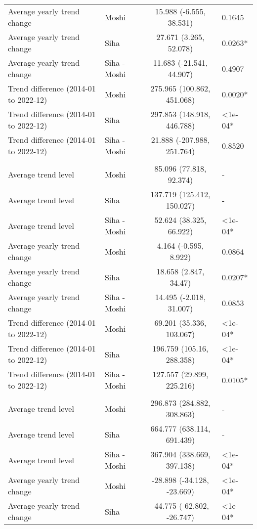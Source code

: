 \begin{longtable}{l|lcl}
Average yearly trend change & Moshi & 15.988 (-6.555, 38.531) & 0.1645 \\ 
Average yearly trend change & Siha & 27.671 (3.265, 52.078) & 0.0263* \\ 
Average yearly trend change & Siha - Moshi & 11.683 (-21.541, 44.907) & 0.4907 \\ 
Trend difference (2014-01 to 2022-12) & Moshi & 275.965 (100.862, 451.068) & 0.0020* \\ 
Trend difference (2014-01 to 2022-12) & Siha & 297.853 (148.918, 446.788) & <1e-04* \\ 
Trend difference (2014-01 to 2022-12) & Siha - Moshi & 21.888 (-207.988, 251.764) & 0.8520 \\ 
\midrule\addlinespace[2.5pt]
\multicolumn{4}{l}{Infectious Eye Disease} \\[2.5pt] 
\midrule\addlinespace[2.5pt]
Average trend level & Moshi & 85.096 (77.818, 92.374) & - \\ 
Average trend level & Siha & 137.719 (125.412, 150.027) & - \\ 
Average trend level & Siha - Moshi & 52.624 (38.325, 66.922) & <1e-04* \\ 
Average yearly trend change & Moshi & 4.164 (-0.595, 8.922) & 0.0864 \\ 
Average yearly trend change & Siha & 18.658 (2.847, 34.47) & 0.0207* \\ 
Average yearly trend change & Siha - Moshi & 14.495 (-2.018, 31.007) & 0.0853 \\ 
Trend difference (2014-01 to 2022-12) & Moshi & 69.201 (35.336, 103.067) & <1e-04* \\ 
Trend difference (2014-01 to 2022-12) & Siha & 196.759 (105.16, 288.358) & <1e-04* \\ 
Trend difference (2014-01 to 2022-12) & Siha - Moshi & 127.557 (29.899, 225.216) & 0.0105* \\ 
\midrule\addlinespace[2.5pt]
\multicolumn{4}{l}{Intestinal Worms} \\[2.5pt] 
\midrule\addlinespace[2.5pt]
Average trend level & Moshi & 296.873 (284.882, 308.863) & - \\ 
Average trend level & Siha & 664.777 (638.114, 691.439) & - \\ 
Average trend level & Siha - Moshi & 367.904 (338.669, 397.138) & <1e-04* \\ 
Average yearly trend change & Moshi & -28.898 (-34.128, -23.669) & <1e-04* \\ 
Average yearly trend change & Siha & -44.775 (-62.802, -26.747) & <1e-04* \\ 

\end{longtable}
